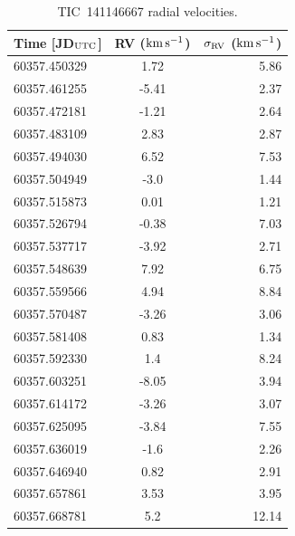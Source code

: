 \documentclass{nature3}
\newcommand{\kms}{\ensuremath{\rm km\,s^{-1}}}
\begin{document}
\begin{methods}
\begin{table}
  \centering
  \begin{tabular}{lcr}
  \hline 
  \hline 
  Time [JD$_{\rm UTC}$] & RV (\kms) & $\sigma_{\rm RV}$ (\kms) \\
  \hline 
  60357.450329 & 1.72 & 5.86 \\
  60357.461255 & -5.41 & 2.37 \\
  60357.472181 & -1.21 & 2.64 \\
  60357.483109 & 2.83 & 2.87 \\
  60357.494030 & 6.52 & 7.53 \\
  60357.504949 & -3.0 & 1.44 \\
  60357.515873 & 0.01 & 1.21 \\
  60357.526794 & -0.38 & 7.03 \\
  60357.537717 & -3.92 & 2.71 \\
  60357.548639 & 7.92 & 6.75 \\
  60357.559566 & 4.94 & 8.84 \\
  60357.570487 & -3.26 & 3.06 \\
  60357.581408 & 0.83 & 1.34 \\
  60357.592330 & 1.4 & 8.24 \\
  60357.603251 & -8.05 & 3.94 \\
  60357.614172 & -3.26 & 3.07 \\
  60357.625095 & -3.84 & 7.55 \\
  60357.636019 & -1.6 & 2.26 \\
  60357.646940 & 0.82 & 2.91 \\
  60357.657861 & 3.53 & 3.95 \\
  60357.668781 & 5.2 & 12.14 \\
  \hline
  \end{tabular}
  \caption{TIC~141146667 radial velocities.}
  \label{tab:rv}
\end{table}



\end{methods}

   
\end{document}
